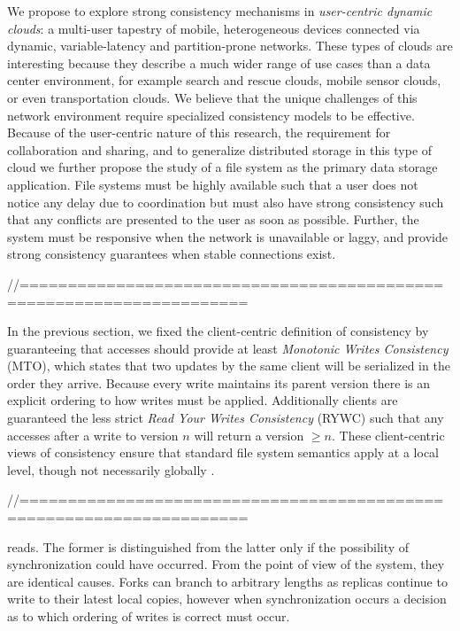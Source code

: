 We propose to explore strong consistency mechanisms in \textit{user-centric dynamic clouds}: a
multi-user tapestry of mobile, heterogeneous devices connected via dynamic, variable-latency and
partition-prone networks.
These types of clouds are interesting because they describe a much wider range of use
cases than a data center environment, for example search and rescue clouds, mobile sensor
clouds, or even transportation clouds.
We believe that the unique challenges of this network environment require specialized
consistency models to be effective.
Because of the user-centric nature of this research, the requirement for collaboration and
sharing, and to generalize distributed storage in this type of cloud we further propose
the study of a file system as the primary data storage application.
File systems must be highly available such that a user does not notice any delay due to
coordination but must also have strong consistency such that any conflicts are presented
to the user as soon as possible.
Further, the system must be responsive when the network is unavailable or laggy, and provide strong
consistency guarantees when stable connections exist.

//=====================================================================

In the previous section, we fixed the client-centric definition of consistency by
guaranteeing that accesses should provide at least \textit{Monotonic Writes Consistency}
(MTO), which states that two updates by the same client will be serialized in the order
they arrive. Because every write maintains its parent version there is an explicit
ordering to how writes must be applied. Additionally clients are guaranteed the less
strict \textit{Read Your Writes Consistency} (RYWC) such that any accesses after a write
to version $n$ will return a version $\geq n$. These client-centric views of consistency
ensure that standard file system semantics apply at a local level, though not necessarily
globally \cite{bermbach_consistency_2013}.

//=====================================================================

reads.
The former is distinguished from the latter only if the possibility of synchronization
could have occurred.
From the point of view of the system, they are identical causes.
Forks can branch to arbitrary lengths as replicas continue to write to their latest local
copies, however when synchronization occurs a decision as to which ordering of writes is
correct must occur.

